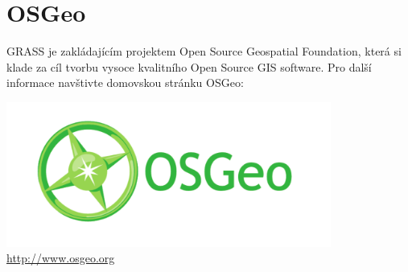 \documentclass[notumble,a4paper,10pt,nofoldmark]{leaflet}
\begin{document}
\vfill
\section{OSGeo}

GRASS je zakládajícím projektem Open Source Geospatial Foundation,
která si klade za cíl tvorbu vysoce kvalitního Open Source GIS
software. Pro další informace navštivte domovskou stránku OSGeo:
\begin{center}
\includegraphics[width=0.8\textwidth]{OSGeo_CMYK}\\
\url{http://www.osgeo.org}
\end{center}
\end{document}
